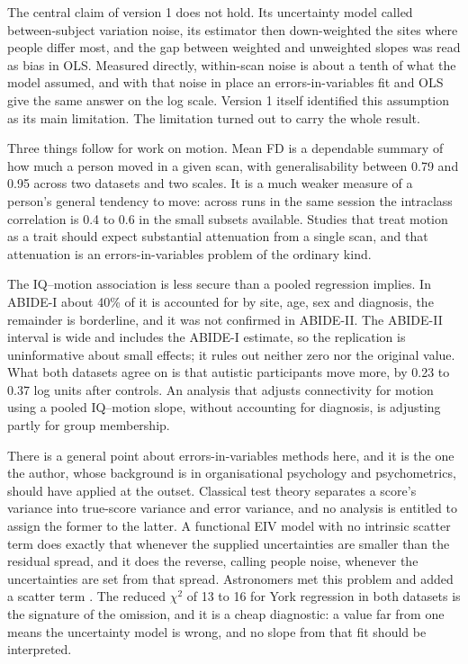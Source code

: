 \documentclass[11pt,a4paper]{article}
\begin{document}
The central claim of version 1 does not hold. Its uncertainty model called between-subject variation noise, its estimator then down-weighted the sites where people differ most, and the gap between weighted and unweighted slopes was read as bias in OLS. Measured directly, within-scan noise is about a tenth of what the model assumed, and with that noise in place an errors-in-variables fit and OLS give the same answer on the log scale. Version 1 itself identified this assumption as its main limitation. The limitation turned out to carry the whole result.

Three things follow for work on motion. Mean FD is a dependable summary of how much a person moved in a given scan, with generalisability between 0.79 and 0.95 across two datasets and two scales. It is a much weaker measure of a person's general tendency to move: across runs in the same session the intraclass correlation is 0.4 to 0.6 in the small subsets available. Studies that treat motion as a trait should expect substantial attenuation from a single scan, and that attenuation is an errors-in-variables problem of the ordinary kind.

The IQ--motion association is less secure than a pooled regression implies. In ABIDE-I about 40\% of it is accounted for by site, age, sex and diagnosis, the remainder is borderline, and it was not confirmed in ABIDE-II. The ABIDE-II interval is wide and includes the ABIDE-I estimate, so the replication is uninformative about small effects; it rules out neither zero nor the original value. What both datasets agree on is that autistic participants move more, by 0.23 to 0.37 log units after controls. An analysis that adjusts connectivity for motion using a pooled IQ--motion slope, without accounting for diagnosis, is adjusting partly for group membership.

There is a general point about errors-in-variables methods here, and it is the one the author, whose background is in organisational psychology and psychometrics, should have applied at the outset. Classical test theory separates a score's variance into true-score variance and error variance, and no analysis is entitled to assign the former to the latter. A functional EIV model with no intrinsic scatter term does exactly that whenever the supplied uncertainties are smaller than the residual spread, and it does the reverse, calling people noise, whenever the uncertainties are set from that spread. Astronomers met this problem and added a scatter term \citep{Tremaine2002, Kelly2007}. The reduced $\chi^2$ of 13 to 16 for York regression in both datasets is the signature of the omission, and it is a cheap diagnostic: a value far from one means the uncertainty model is wrong, and no slope from that fit should be interpreted.
\end{document}
